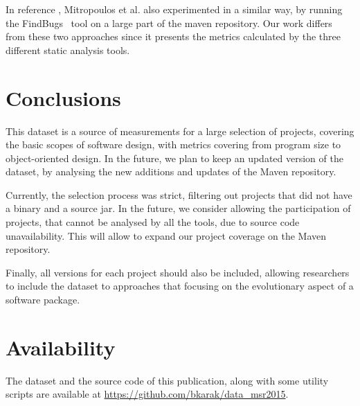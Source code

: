 \documentclass{sig-alternate}
\begin{document}
In reference \cite{MKLGS14}, Mitropoulos et al. also experimented in a similar way, by running the FindBugs~\cite{HP04} tool on a large part of the maven repository. Our work differs from these two approaches since it presents the metrics calculated by the three different static analysis tools.

\section{Conclusions}
\label{sec:conc}

This dataset is a source of measurements for a large selection of projects, covering the basic scopes of software design, with metrics covering from program size to object-oriented design. In the future, we plan to keep an updated version of the dataset, by analysing the new additions and updates of the Maven repository.

Currently, the selection process was strict, filtering out projects that did not have a binary and a source {\sc jar}. In the future, we consider allowing the participation of projects, that cannot be analysed by all the tools, due to source code unavailability. This will allow to expand our project coverage on the Maven repository.

Finally, all versions for each project should also be included, allowing researchers to include the dataset to approaches that focusing on the evolutionary aspect of a software package.

\section{Availability}

The dataset and the source code of this publication, along with some utility scripts are available at \url{https://github.com/bkarak/data_msr2015}.



\end{document}
